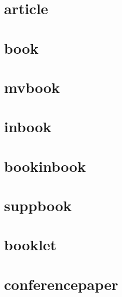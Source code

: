 \documentclass{article}
\begin{document}
\section{article}

\cite[1]{article}

\cite[1]{article}

\section{book}

\cite[1]{book}

\cite[1]{book}

\section{mvbook}

\cite[1]{mvbook}

\cite[1]{mvbook}

\section{inbook}

\cite[1]{inbook}

\cite[1]{inbook}

\section{bookinbook}

\cite[1]{bookinbook}

\cite[1]{bookinbook}

\section{suppbook}

\cite[1]{suppbook}

\cite[1]{suppbook}

\section{booklet}

\cite[1]{booklet}

\cite[1]{booklet}

\section{conferencepaper}

\cite[1]{conferencepaper}
\end{document}
